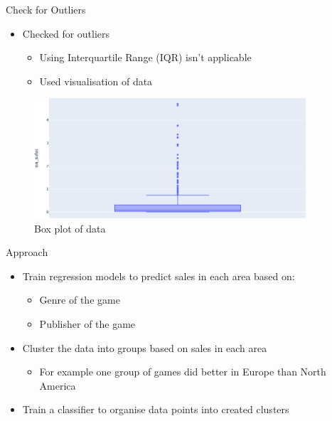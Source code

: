 \documentclass{beamer}
\begin{document}
\begin{frame}{Check for Outliers}

\begin{itemize}
    \item Checked for outliers
    \begin{itemize}
        \item Using Interquartile Range (IQR) isn't applicable
        \item Used visualisation of data
    \end{itemize}
\end{itemize}

\begin{center}  
    \begin{figure}
    \centering
        \includegraphics[width=0.9\textwidth]{img/boxplot.png}
            \vspace{-2mm}
        \caption{Box plot of data}
    \end{figure}
\end{center}

\end{frame}


\begin{frame}{Approach}

\begin{itemize}
    \item Train regression models to predict sales in each area based on:
    \begin{itemize}
        \item Genre of the game
        \item Publisher of the game
    \end{itemize}

    \vspace{3mm}

    \item Cluster the data into groups based on sales in each area
    \begin{itemize}
        \item For example one group of games did better in Europe than North America
    \end{itemize}

    \vspace{3mm}

    \item Train a classifier to organise data points into created clusters
\end{itemize}

\end{frame}
\end{document}
